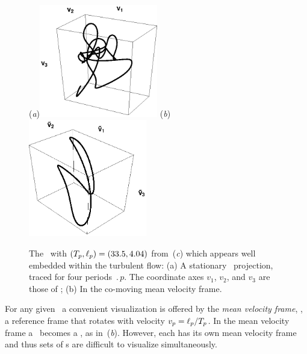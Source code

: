 \begin{figure}[t]
\begin{center}
(\textit{a})\includegraphics[width=0.46\textwidth, clip=true]{figs_bmp/ks22rpo033.50_04.045E2.eps}
(\textit{b})\includegraphics[width=0.46\textwidth, clip=true]{figs_bmp/ks22rpo033.50_04.045E2CM.eps}
\\
\end{center}
\caption{
 The
\rpo\ with $({T_{p}},\ell_p) =(33.5,4.04)$
from \,(\textit{c})
which appears well embedded within the turbulent flow:
 (a) A stationary \statesp\ projection,
  traced for four periods $\period{p}$. The coordinate axes
$v_1$, $v_2$, and $v_3$ are those of ;
 (b) In the co-moving mean velocity frame.
        } \label{f:MeanVelocityFrame}
\end{figure}

For any given \rpo\ a convenient visualization is
offered by the {\em mean velocity frame}, {\ie},
a reference frame that rotates with velocity
$v_p=\ell_p/{T_{p}}$.
In the mean velocity frame a \rpo\ becomes
a \po, as in \,(\textit{b}).
However, each {\rpo} has its own mean velocity frame and thus
sets of \rpo s are difficult to visualize simultaneously.

